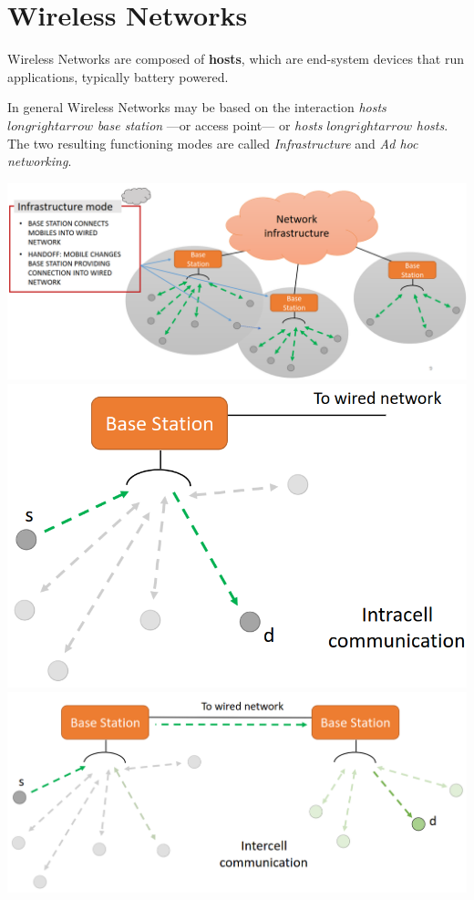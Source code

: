 \chapter{Wireless Networks}
Wireless Networks are composed of \textbf{hosts}, which are end-system devices that run
applications, typically battery powered.

In general Wireless Networks may be based on the interaction \textit{hosts} $longrightarrow$ \textit{base station} ---or access point--- or \textit{hosts} $longrightarrow$ \textit{hosts}.
The two resulting functioning modes are called \textit{Infrastructure} and \textit{Ad hoc networking}.

\begin{paracol}{2}
   \colfill
   \includegraphics[width=0.9\columnwidth]{images/wirelessnet_infrastructure.png}
   \colfill
   \switchcolumn
   \colfill
   \includegraphics[width=0.9\columnwidth]{images/wirelessnet_cell1.png}\\
   \includegraphics[width=0.9\columnwidth]{images/wirelessnet_cell2.png}
   \colfill
\end{paracol}

